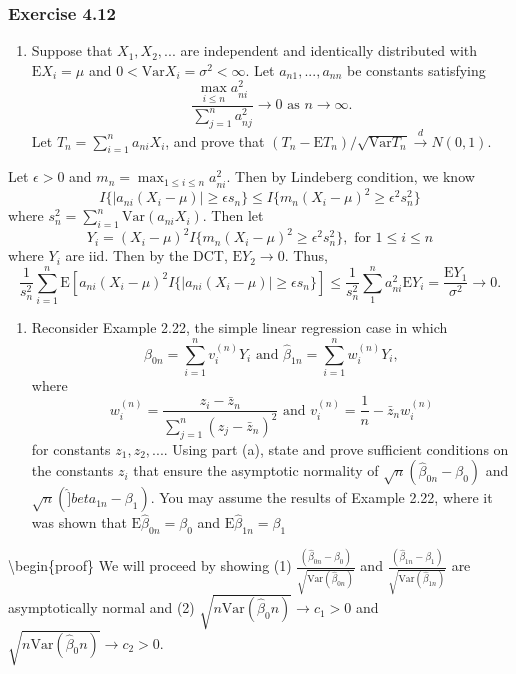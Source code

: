\documentclass[12pt,]{article}
\providecommand{\tightlist}{%
  \setlength{\itemsep}{0pt}\setlength{\parskip}{0pt}}
\begin{document}
\hypertarget{exercise-4.12}{%
\subsubsection{Exercise 4.12}\label{exercise-4.12}}

\begin{enumerate}
\def\labelenumi{(\alph{enumi})}
\tightlist
\item
  Suppose that \(X_1, X_2,...\) are independent and identically
  distributed with \(\text{E}X_i =\mu\) and
  \(0<\text{Var} X_i=\sigma^2<\infty.\) Let \(a_{n1},...,a_{nn}\) be
  constants satisfying
  \[\frac{\max_{i\le n} a_{ni}^2}{\sum_{j=1}^na_{nj}^2}\rightarrow 0 \text{ as } n\rightarrow \infty.\]
  Let \(T_n=\sum_{i=1}^n a_{ni}X_i\), and prove that
  \((T_n-\text{E}T_n)/\sqrt{\text{Var} T_n}\overset{d}\rightarrow N(0,1).\)
\end{enumerate}

Let \(\epsilon > 0\) and \(m_n = \max_{1\le i \le n} a_{ni}^2\). Then by
Lindeberg condition, we know
\[I\{|a_{ni}(X_i-\mu)|\ge \epsilon s_n\} \le I\{m_n(X_i-\mu)^2\ge \epsilon^2s_n^2\}\]
where \(s_n^2 = \sum_{i=1}^n \text{Var}(a_{ni}X_i).\) Then let
\[Y_i = (X_i-\mu)^2 I\{m_n(X_i-\mu)^2\ge \epsilon^2 s_n^2\}, \text{ for } 1\le i\le n\]
where \(Y_i\) are iid. Then by the DCT, \(\text{E}Y_2 \rightarrow 0.\)
Thus,
\[\frac{1}{s_n^2}\sum_{i=1}^n\text{E}[a_{ni}(X_i-\mu)^2I\{|a_{ni}(X_i-\mu)|\ge \epsilon s_n\}]\le \frac{1}{s_n^2}\sum_{1}^na_{ni}^2\text{E}Y_i=\frac{\text{E}Y_1}{\sigma^2}\rightarrow 0.\]

\begin{enumerate}
\def\labelenumi{(\alph{enumi})}
\setcounter{enumi}{1}
\tightlist
\item
  Reconsider Example 2.22, the simple linear regression case in which
  \[\hat\beta_{0n}=\sum_{i=1}^n v_i^{(n)}Y_i \text{ and } \hat\beta_{1n}=\sum_{i=1}^nw_i^{(n)}Y_i,\]
  where
  \[w_i^{(n)}=\frac{z_i-\bar z_n}{\sum_{j=1}^n(z_j-\bar z_n)^2} \text{ and } v_i^{(n)}=\frac{1}{n}-\bar z_nw_i^{(n)}\]
  for constants \(z_1, z_2, ...\). Using part (a), state and prove
  sufficient conditions on the constants \(z_i\) that ensure the
  asymptotic normality of \(\sqrt{n}(\hat\beta_{0n}-\beta_0)\) and
  \(\sqrt{n}(\hat]beta_{1n}-\beta_1).\) You may assume the results of
  Example 2.22, where it was shown that
  \(\text{E} \hat\beta_{0n}=\beta_{0}\) and
  \(\text{E}\hat\beta_{1n}=\beta_1\)
\end{enumerate}

\textbackslash{}begin\{proof\} We will proceed by showing (1)
\(\frac{(\hat\beta_{0n}-\beta_0)}{\sqrt{\text{Var}(\hat\beta_{0n})}}\)
and
\(\frac{(\hat\beta_{1n}-\beta_1)}{\sqrt{\text{Var}(\hat\beta_{1n})}}\)
are asymptotically normal and (2)
\(\sqrt{n\text{Var}(\hat\beta_0n)}\rightarrow c_1>0\) and
\(\sqrt{n\text{Var}(\hat\beta_0n)}\rightarrow c_2>0\).
\end{document}
